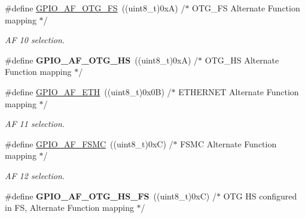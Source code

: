 \begin{DoxyCompactItemize}
\#define \hyperlink{group___g_p_i_o___alternat__function__selection__define_gaeba0aeefec841e505170efc7762ae588}{G\+P\+I\+O\+\_\+\+A\+F\+\_\+\+O\+T\+G\+\_\+\+FS}~((uint8\+\_\+t)0x\+A)  /$\ast$ O\+T\+G\+\_\+\+F\+S Alternate Function mapping $\ast$/
\begin{DoxyCompactList}\small\item\em AF 10 selection. \end{DoxyCompactList}\item 
\mbox{\label{group___g_p_i_o___alternat__function__selection__define_gaa92d928ec3d83bfef06877092178960a}} 
\#define {\bfseries G\+P\+I\+O\+\_\+\+A\+F\+\_\+\+O\+T\+G\+\_\+\+HS}~((uint8\+\_\+t)0x\+A)  /$\ast$ O\+T\+G\+\_\+\+H\+S Alternate Function mapping $\ast$/
\item 
\mbox{\label{group___g_p_i_o___alternat__function__selection__define_ga26cf3f30fe5154bd461b27fab58e45e2}} 
\#define \hyperlink{group___g_p_i_o___alternat__function__selection__define_ga26cf3f30fe5154bd461b27fab58e45e2}{G\+P\+I\+O\+\_\+\+A\+F\+\_\+\+E\+TH}~((uint8\+\_\+t)0x0\+B)  /$\ast$ E\+T\+H\+E\+R\+N\+E\+T Alternate Function mapping $\ast$/
\begin{DoxyCompactList}\small\item\em AF 11 selection. \end{DoxyCompactList}\item 
\mbox{\label{group___g_p_i_o___alternat__function__selection__define_ga8378a89ae1a16d5ae5d315ca49a57674}} 
\#define \hyperlink{group___g_p_i_o___alternat__function__selection__define_ga8378a89ae1a16d5ae5d315ca49a57674}{G\+P\+I\+O\+\_\+\+A\+F\+\_\+\+F\+S\+MC}~((uint8\+\_\+t)0x\+C)  /$\ast$ F\+S\+M\+C Alternate Function mapping $\ast$/
\begin{DoxyCompactList}\small\item\em AF 12 selection. \end{DoxyCompactList}\item 
\mbox{\label{group___g_p_i_o___alternat__function__selection__define_ga5f30e17f7328fa05e6dd8b799ae5e6ee}} 
\#define {\bfseries G\+P\+I\+O\+\_\+\+A\+F\+\_\+\+O\+T\+G\+\_\+\+H\+S\+\_\+\+FS}~((uint8\+\_\+t)0x\+C)  /$\ast$ O\+T\+G H\+S configured in F\+S, Alternate Function mapping $\ast$/

\end{DoxyCompactItemize}
